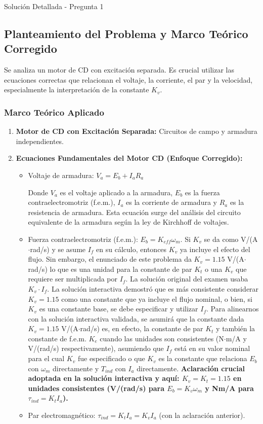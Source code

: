 \documentclass[12pt]{article}
\begin{document}
\begin{solutionbox}{Solución Detallada - Pregunta 1}

\subsection*{Planteamiento del Problema y Marco Teórico Corregido}
Se analiza un motor de CD con excitación separada. Es crucial utilizar las ecuaciones correctas que relacionan el voltaje, la corriente, el par y la velocidad, especialmente la interpretación de la constante $K_v$.

\subsubsection*{Marco Teórico Aplicado}
\begin{enumerate}
    \item \textbf{Motor de CD con Excitación Separada:} Circuitos de campo y armadura independientes.
    \item \textbf{Ecuaciones Fundamentales del Motor CD (Enfoque Corregido):}
    \begin{itemize}
        \item Voltaje de armadura: $V_a = E_b + I_a R_a$
        
        Donde $V_a$ es el voltaje aplicado a la armadura, $E_b$ es la fuerza contraelectromotriz (f.e.m.), $I_a$ es la corriente de armadura y $R_a$ es la resistencia de armadura. Esta ecuación surge del análisis del circuito equivalente de la armadura según la ley de Kirchhoff de voltajes.
        
        \item Fuerza contraelectromotriz (f.e.m.): $E_b = K_{eff} \omega_m$. Si $K_v$ se da como V/(A$\cdot$rad/s) y se asume $I_f$ en su cálculo, entonces $K_v$ ya incluye el efecto del flujo. Sin embargo, el enunciado de este problema da $K_v = 1.15$ V/(A$\cdot$rad/s) lo que es una unidad para la constante de par $K_t$ o una $K_v$ que requiere ser multiplicada por $I_f$. La solución original del examen usaba $K_v \cdot I_f$. La solución interactiva demostró que es más consistente considerar $K_v = 1.15$ como una constante que ya incluye el flujo nominal, o bien, si $K_v$ es una constante base, se debe especificar y utilizar $I_f$. Para alinearnos con la solución interactiva validada, se asumirá que la constante dada $K_v=1.15$ V/(A$\cdot$rad/s) es, en efecto, la constante de par $K_t$ y también la constante de f.e.m. $K_e$ cuando las unidades son consistentes (N$\cdot$m/A y V/(rad/s) respectivamente), asumiendo que $I_f$ está en su valor nominal para el cual $K_v$ fue especificado o que $K_v$ es la constante que relaciona $E_b$ con $\omega_m$ directamente y $T_{ind}$ con $I_a$ directamente.
        \textbf{Aclaración crucial adoptada en la solución interactiva y aquí: $K_v = K_t = 1.15$ en unidades consistentes (V/(rad/s) para $E_b = K_v \omega_m$ y Nm/A para $\tau_{ind} = K_t I_a$).}
        \item Par electromagnético: $\tau_{ind} = K_t I_a = K_v I_a$ (con la aclaración anterior).
    \end{itemize}
    

\end{enumerate}
\end{solutionbox}
\end{document}
